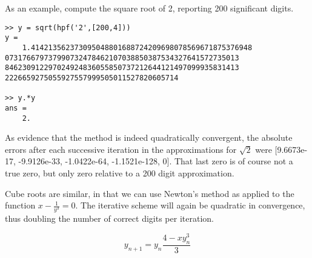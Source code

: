 \documentclass[a4paper,12pt]{article}
\begin{document}
As an example, compute the square root of 2, reporting 200 significant digits.

\begin{lstlisting}
>> y = sqrt(hpf('2',[200,4]))
y =
    1.414213562373095048801688724209698078569671875376948
073176679737990732478462107038850387534327641572735013
846230912297024924836055850737212644121497099935831413
2226659275055927557999505011527820605714

>> y.*y
ans =
    2.
\end{lstlisting}

As evidence that the method is indeed quadratically convergent, the absolute errors after each successive iteration in the approximations for $\sqrt 2$ were [9.6673e-17, -9.9126e-33, -1.0422e-64, -1.1521e-128, 0]. That last zero is of course not a true zero, but only zero relative to a 200 digit approximation.

Cube roots are similar, in that we can use Newton's method as applied to the function $x - \frac{1}{y^3} = 0$. The iterative scheme will again be quadratic in convergence, thus doubling the number of correct digits per iteration.

\begin{equation}
   y_{n+1} = y_n \frac{4 - x y_n^3}{3}
\end{equation}
\end{document}
